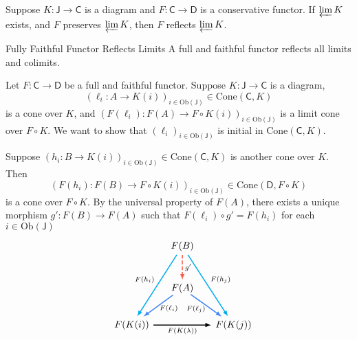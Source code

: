 \begin{proposition}{}{}
    Suppose $K:\mathsf{J}\to \mathsf{C}$ is a diagram and $F:\mathsf{C}\to\mathsf{D}$ is a conservative functor. If $\varprojlim K$ exists, and $F$ preserves $\varprojlim K$, then $F$ reflects $\varprojlim K$.
\end{proposition}


\begin{proposition}{Fully Faithful Functor Reflects Limits}{}
    A full and faithful functor reflects all limits and
colimits.
\end{proposition}

\begin{prf}
    Let $F: \mathsf{C} \rightarrow \mathsf{D}$ be a full and faithful functor. Suppose $K: \mathsf{J} \rightarrow \mathsf{C}$ is a diagram, 
    $$
    \left(\ell_i: A \rightarrow K(i)\right)_{i\in \mathrm{Ob}(\mathsf{J})}\in \mathrm{Cone}\left(\mathsf{C},K\right)
    $$ 
    is a cone over $K$, and $\left(F(\ell_i): F(A) \rightarrow F\circ K(i)\right)_{i\in \mathrm{Ob}(\mathsf{J})}$ is a limit cone over $F\circ K$. We want to show that $\left(\ell_i\right)_{i\in \mathrm{Ob}(\mathsf{J})}$ is initial in $\mathrm{Cone}\left(\mathsf{C},K\right)$.
    
    
    Suppose $\left(h_i:B \rightarrow K(i)\right)_{i\in \mathrm{Ob}(\mathsf{J})}\in \mathrm{Cone}\left(\mathsf{C},K\right)$ is another cone over $K$. Then 
    \[
    \left( F(h_i): F(B)\longrightarrow F\circ K(i)\right)_{i\in \mathrm{Ob}(\mathsf{J})}\in \mathrm{Cone}\left(\mathsf{D},F\circ K\right)
    \]
    is a cone over $F\circ K$. By the universal property of $F(A)$, there exists a unique morphism $g':F(B)\to F(A)$ such that $F(\ell_i) \circ g' = F(h_i)$ for each $i\in \mathrm{Ob}(\mathsf{J})$
    \[
        \begin{tikzcd}[ampersand replacement=\&, every arrow/.append style={-latex, line width=1.1pt}]
            \&   [-1.5em]                \&[-1em] F(B) \arrow[rdd, draw=cyan, "F(h_j)"] \arrow[ldd, draw=cyan, "F(h_i)"'] \arrow[d, dash pattern=on 4pt off 2pt, draw=arrowRed, "g'"] \& [-1em]                  \\[+0.3cm]
            \&                   \& F(A)\arrow[ld, draw=arrowBlue, shorten <=-3pt, "F(\ell_i)" yshift=4.5pt] \arrow[rd, draw=arrowBlue, shorten <=-4.5pt, "F(\ell_j)"' yshift=4pt]               \&                   \\[0.1cm]
        \& F(K(i)) \arrow[rr, "F(K(\lambda))"']\&   \& F(K(j))
        \end{tikzcd}
    \]
    

\end{prf}
